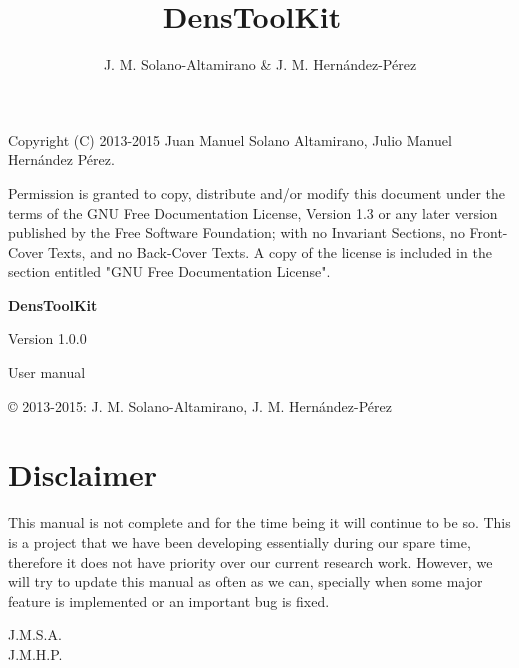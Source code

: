 \documentclass[12pt]{book}
\title{\textbf{Dens\-Tool\-Kit~\dtkversion}}
\author{J. M. Solano-Altamirano \& J. M. Hern\'andez-P\'erez}
\newcommand{\dtkversion}{1.0.0}
\begin{document}
\frontmatter
\maketitle

\newpage
\thispagestyle{empty}
\phantom{as}
\vspace{5cm}
Copyright (C) 2013-2015  Juan Manuel Solano Altamirano, Julio Manuel Hern\'andez P\'erez.

    Permission is granted to copy, distribute and/or modify this document
    under the terms of the GNU Free Documentation License, Version 1.3
    or any later version published by the Free Software Foundation;
    with no Invariant Sections, no Front-Cover Texts, and no Back-Cover Texts.
    A copy of the license is included in the section entitled "GNU
    Free Documentation License".
\newpage
\thispagestyle{empty}
\phantom{asf}
\vspace{5cm}
\begin{center}

{\HUGE\bf Dens\-Tool\-Kit}

\vspace{1cm}

{\Huge Version \dtkversion}

\vspace{1cm}

{\Huge User manual}

\end{center}

\vspace{8cm}
\copyright{} 2013-2015: J. M. Solano-Altamirano, J. M. Hern\'andez-P\'erez

\newpage\thispagestyle{empty}
\phantom{asd}

\vspace{50mm}

\section*{Disclaimer}

This manual is not complete and for the time being it will continue to be so. This is a project that we have been developing essentially during our spare time, therefore it does not have priority over our current research work. However, we will try to update this manual as often as we can, specially when some major feature is implemented or an important bug is fixed.

\begin{flushright} J.M.S.A. \\ J.M.H.P.\end{flushright}
\end{document}
